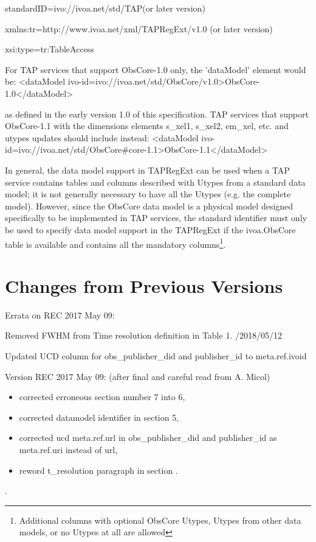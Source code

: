 \documentclass[11pt,a4paper]{ivoa}
\begin{document}
standardID={\textquotedbl}ivo://ivoa.net/std/TAP{\textquotedbl}(or later version)

xmlns:tr={\textquotedbl}http://www.ivoa.net/xml/TAPRegExt/v1.0{\textquotedbl} (or later version) 

xsi:type={\textquotedbl}tr:TableAccess{\textquotedbl}

For TAP services that support ObsCore-1.0 only, the {}'dataModel' element would be:   {\textless}dataModel
ivo-id={\textquotedbl}ivo://ivoa.net/std/ObsCore/v1.0{\textquotedbl}{\textgreater}ObsCore-1.0{\textless}/dataModel{\textgreater}


as defined in the early version 1.0 of this specification.  TAP services that support ObsCore-1.1 with the dimensions
elements s\_xel1, s\_xel2, em\_xel, etc. and utypes updates should include instead:  {\textless}dataModel
ivo-id={\textquotedbl}ivo://ivoa.net/std/ObsCore\#core-1.1{\textquotedbl}{\textgreater}ObsCore-1.1{\textless}/dataModel{\textgreater}


In general, the data model support in TAPRegExt can be used when a TAP service contains tables and columns described
with Utypes from a standard data model; it is not generally necessary to have all the Utypes (e.g. the complete model).
However, since the ObsCore data model is a physical model designed specifically to be implemented in TAP services, the
standard identifier must only be used to specify data model support in the TAPRegExt if the ivoa.ObsCore table is
available and contains all the mandatory columns\footnote{ Additional columns with optional ObsCore Utypes, Utypes from
other data models, or no Utypes at all are allowed}.

\appendix
\section{Changes from Previous Versions}
Errata on REC 2017 May 09:

Removed FWHM from Time resolution definition in Table 1.  /2018/05/12

Updated UCD column for obs\_publisher\_did and publisher\_id to  meta.ref.ivoid

Version REC 2017 May 09: (after final and careful read from A. Micol)

\begin{itemize}
\item corrected erroneous section number 7 into 6, 
\item corrected  datamodel identifier in section 5,
\item corrected ucd meta.ref.url in obs\_publisher\_did and publisher\_id  as meta.ref.uri instead of url,
\item reword t\_resolution paragraph in section .
\end{itemize}
.
\end{document}
